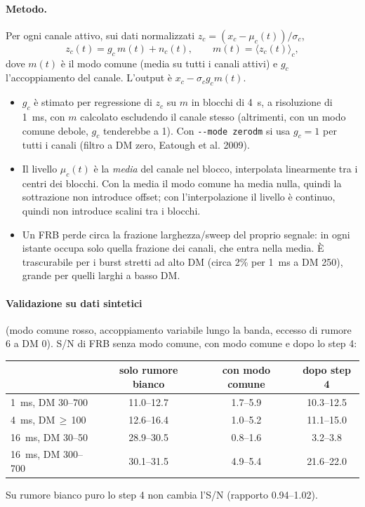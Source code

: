 \paragraph{Metodo.} Per ogni canale attivo, sui dati normalizzati $z_c=(x_c-\mu_c(t))/\sigma_c$,
\begin{equation}
z_c(t)=g_c\,m(t)+n_c(t),\qquad m(t)=\langle z_c(t)\rangle_c ,
\end{equation}
dove $m(t)$ è il modo comune (media su tutti i canali attivi) e $g_c$ l'accoppiamento del canale. L'output è
$x_c-\sigma_c g_c m(t)$.
\begin{itemize}
  \item $g_c$ è stimato per regressione di $z_c$ su $m$ in blocchi di \SI{4}{\second}, a risoluzione di
    \SI{1}{\milli\second}, con $m$ calcolato escludendo il canale stesso (altrimenti, con un modo comune debole, $g_c$
    tenderebbe a 1). Con \texttt{-{}-mode zerodm} si usa $g_c=1$ per tutti i canali (filtro a DM zero, Eatough et al.
    2009).
  \item Il livello $\mu_c(t)$ è la \emph{media} del canale nel blocco, interpolata linearmente tra i centri dei blocchi.
    Con la media il modo comune ha media nulla, quindi la sottrazione non introduce offset; con l'interpolazione il
    livello è continuo, quindi non introduce scalini tra i blocchi.
  \item Un FRB perde circa la frazione larghezza/sweep del proprio segnale: in ogni istante occupa solo quella frazione
    dei canali, che entra nella media. È trascurabile per i burst stretti ad alto DM (circa 2\% per \SI{1}{\milli\second}
    a DM 250), grande per quelli larghi a basso DM.
\end{itemize}

\paragraph{Validazione su dati sintetici} (modo comune rosso, accoppiamento variabile lungo la banda, eccesso di rumore
6 a DM 0). S/N di FRB senza modo comune, con modo comune e dopo lo step 4:
\begin{center}
\small
\begin{tabular}{lccc}
\toprule
 & solo rumore bianco & con modo comune & dopo step 4 \\
\midrule
\SI{1}{\milli\second}, DM 30--700 & 11.0--12.7 & 1.7--5.9 & 10.3--12.5 \\
\SI{4}{\milli\second}, DM\,$\geq$\,100 & 12.6--16.4 & 1.0--5.2 & 11.1--15.0 \\
\SI{16}{\milli\second}, DM 30--50 & 28.9--30.5 & 0.8--1.6 & 3.2--3.8 \\
\SI{16}{\milli\second}, DM 300--700 & 30.1--31.5 & 4.9--5.4 & 21.6--22.0 \\
\bottomrule
\end{tabular}
\end{center}
Su rumore bianco puro lo step 4 non cambia l'S/N (rapporto 0.94--1.02).

